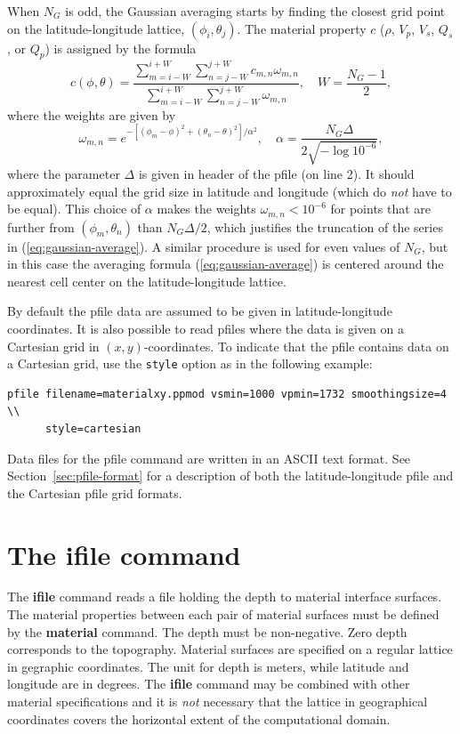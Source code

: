 \documentclass[11pt]{report}
\begin{document}
When $N_G$ is odd, the Gaussian averaging starts by finding the closest grid point on the
latitude-longitude lattice, $(\phi_i,\theta_j)$. The material property $c$ ($\rho$, $V_p$, $V_s$,
$Q_s$, or $Q_p$) is assigned by the formula
\begin{equation}\label{eq:gaussian-average}
c(\phi,\theta) = \dfrac{ \sum_{m=i-W}^{i+W} \sum_{n=j-W}^{j+W} c_{m,n} \omega_{m,n} }
{ \sum_{m=i-W}^{i+W} \sum_{n=j-W}^{j+W} \omega_{m,n} },\quad W = \frac{N_G-1}{2},
\end{equation}
where the weights are given by
\[
\omega_{m,n} = e^{-[(\phi_m-\phi)^2 + (\theta_n-\theta)^2]/\alpha^2},\quad \alpha = \frac{N_G \Delta}{2
  \sqrt{-\log 10^{-6}}},
\]
where the parameter $\Delta$ is given in header of the pfile (on line 2). It should approximately equal the
grid size in latitude and longitude (which do {\em not} have to be equal). This choice of $\alpha$ makes
the weights $\omega_{m,n}<10^{-6}$ for points that are further from $(\phi_m, \theta_n)$ than $N_G
\Delta/2$, which justifies the truncation of the series in (\ref{eq:gaussian-average}). A
similar procedure is used for even values of $N_G$, but in this case the averaging formula
(\ref{eq:gaussian-average}) is centered around the nearest cell center on the latitude-longitude
lattice.

By default the pfile data are assumed to be given in latitude-longitude coordinates. It is also
possible to read pfiles where the data is given on a Cartesian grid in $(x, y)$-coordinates. To
indicate that the pfile contains data on a  Cartesian grid, use the {\tt style}
option as in the following example:
\begin{verbatim}
pfile filename=materialxy.ppmod vsmin=1000 vpmin=1732 smoothingsize=4 \\
      style=cartesian
\end{verbatim}

Data files for the pfile command are written in an ASCII text format. See
Section~\ref{sec:pfile-format} for a description of both the latitude-longitude pfile and the
Cartesian pfile grid formats.

\section{The ifile command}\label{sec:ifile}
The {\bf ifile} command reads a file holding the depth to material interface surfaces. The material
properties between each pair of material surfaces must be defined by the {\bf material} command. The
depth must be non-negative. Zero depth corresponds to the topography. Material surfaces are
specified on a regular lattice in gegraphic coordinates. The unit for depth is meters, while
latitude and longitude are in degrees. The {\bf ifile} command may be combined with other material
specifications and it is {\em not} necessary that the lattice in geographical coordinates covers the
horizontal extent of the computational domain.
\end{document}

